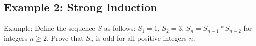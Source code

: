 \documentclass[12pt,letterpaper]{article}
\begin{document}
\subsection{Example 2: Strong Induction}
Example: Define the sequence $S$ as follows: $S_1 = 1$, $S_2 = 3$, $S_n = S_{n-1} * S_{n-2}$ for integers $n \geq 2$. Prove that $S_n$ is odd for all positive integers $n$.

\begin{mdframed}\vspace{4 cm}\end{mdframed}
\end{document}
